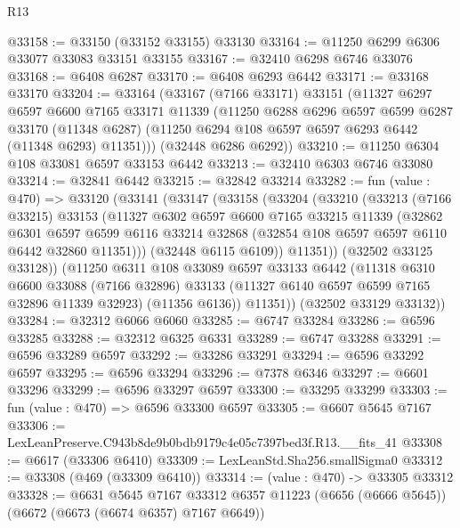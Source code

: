 \begin{lexlean}{R13}
\begin{coremodule}
@33158 := @33150 (@33152 @33155) @33130
@33164 := @11250 @6299 @6306 @33077 @33083 @33151 @33155
@33167 := @32410 @6298 @6746 @33076
@33168 := @6408 @6287
@33170 := @6408 @6293 @6442
@33171 := @33168 @33170
@33204 := @33164
    (@33167
      (@7166 @33171)
      @33151
      (@11327
        @6297
        @6597
        @6600
        @7165
        @33171
        @11339
        (@11250
          @6288
          @6296
          @6597
          @6599
          @6287
          @33170
          (@11348 @6287)
          (@11250 @6294 @108 @6597 @6597 @6293 @6442 (@11348 @6293) @11351)))
      (@32448 @6286 @6292))
@33210 := @11250 @6304 @108 @33081 @6597 @33153 @6442
@33213 := @32410 @6303 @6746 @33080
@33214 := @32841 @6442
@33215 := @32842 @33214
@33282 := fun (value : @470) =>
  @33120
    (@33141
      (@33147
        (@33158
          (@33204
            (@33210
              (@33213
                (@7166 @33215)
                @33153
                (@11327
                  @6302
                  @6597
                  @6600
                  @7165
                  @33215
                  @11339
                  (@32862
                    @6301
                    @6597
                    @6599
                    @6116
                    @33214
                    @32868
                    (@32854 @108 @6597 @6597 @6110 @6442 @32860 @11351)))
                (@32448 @6115 @6109))
              @11351))
          (@32502 @33125 @33128))
        (@11250
          @6311
          @108
          @33089
          @6597
          @33133
          @6442
          (@11318
            @6310
            @6600
            @33088
            (@7166 @32896)
            @33133
            (@11327 @6140 @6597 @6599 @7165 @32896 @11339 @32923)
            (@11356 @6136))
          @11351))
      (@32502 @33129 @33132))
@33284 := @32312 @6066 @6060
@33285 := @6747 @33284
@33286 := @6596 @33285
@33288 := @32312 @6325 @6331
@33289 := @6747 @33288
@33291 := @6596 @33289 @6597
@33292 := @33286 @33291
@33294 := @6596 @33292 @6597
@33295 := @6596 @33294
@33296 := @7378 @6346
@33297 := @6601 @33296
@33299 := @6596 @33297 @6597
@33300 := @33295 @33299
@33303 := fun (value : @470) => @6596 @33300 @6597
@33305 := @6607 @5645 @7167
@33306 := LexLeanPreserve.C943b8de9b0bdb9179c4e05c7397bed3f.R13.__fits_41
@33308 := @6617 (@33306 @6410)
@33309 := LexLeanStd.Sha256.smallSigma0
@33312 := @33308 (@469 (@33309 @6410))
@33314 := (value : @470) -> @33305 @33312
@33328 := @6631
    @5645
    @7167
    @33312
    @6357
    @11223
    (@6656 (@6666 @5645))
    (@6672 (@6673 (@6674 @6357) @7167 @6649))

\end{coremodule}
\end{lexlean}
